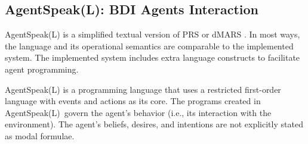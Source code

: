 \vspace{.5cm}

\begin{table}[h]
\small
\centering
\caption{\ac{AOP} versus \ac{OOP}}
\label{AOP versus OOP}
\end{table}

\vspace{.5cm}

\subsection{AgentSpeak(L): \ac{BDI} Agents Interaction}

AgentSpeak(L) is a simplified textual version of \ac{PRS} \cite{prs} or \ac{dMARS} \cite{dmars}. In most ways, the language and its operational semantics are comparable to the implemented system. The implemented system includes extra language constructs to facilitate agent programming.

\vspace{.5cm}

AgentSpeak(L) is a programming language that uses a restricted first-order language with events and actions as its core. The programs created in AgentSpeak(L) govern the agent's behavior (i.e., its interaction with the environment). The agent's beliefs, desires, and intentions are not explicitly stated as modal formulae.

\vspace{.5cm}

